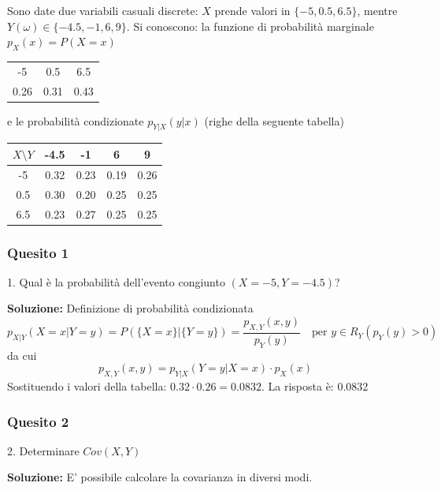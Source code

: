 \documentclass[12pt, a4paper]{article}
\begin{document}
\vspace{0.5cm}
\begin{tcolorbox}[colback=lightergray!10, colframe=tocsec, title=\textbf{Esercizio 2}]
Sono date due variabili casuali discrete: $X$ prende valori in $\{-5, 0.5, 6.5\}$, mentre $Y(\omega) \in \{-4.5, -1, 6, 9\}$.
Si conoscono: la funzione di probabilità marginale $p_X(x)=P(X=x)$
\begin{center}
\begin{tabular}{ccc}
\toprule
-5 & 0.5 & 6.5 \\
0.26 & 0.31 & 0.43 \\
\bottomrule
\end{tabular}
\end{center}
e le probabilità condizionate $p_{Y|X}(y|x)$ (righe della seguente tabella)
\begin{center}
\begin{tabular}{c|cccc}
\toprule
$X \setminus Y$ & -4.5 & -1 & 6 & 9 \\
\midrule
-5 & 0.32 & 0.23 & 0.19 & 0.26 \\
0.5 & 0.30 & 0.20 & 0.25 & 0.25 \\
6.5 & 0.23 & 0.27 & 0.25 & 0.25 \\
\bottomrule
\end{tabular}
\end{center}
\end{tcolorbox}

\subsubsection*{Quesito 1}
1. Qual è la probabilità dell’evento congiunto $(X=-5, Y=-4.5)$?

\textbf{Soluzione:}
Definizione di probabilità condizionata 
$$ p_{X|Y}(X=x|Y=y) = P(\{X=x\}|\{Y=y\}) = \frac{p_{X,Y}(x,y)}{p_Y(y)} \quad \text{per } y \in R_Y(p_Y(y)>0) $$
da cui
$$ p_{X,Y}(x,y) = p_{Y|X}(Y=y|X=x) \cdot p_X(x) $$
Sostituendo i valori della tabella: $0.32 \cdot 0.26 = 0.0832$.
La risposta è: 0.0832

\subsubsection*{Quesito 2}
2. Determinare $Cov(X,Y)$

\textbf{Soluzione:}
E’ possibile calcolare la covarianza in diversi modi.
\end{document}
